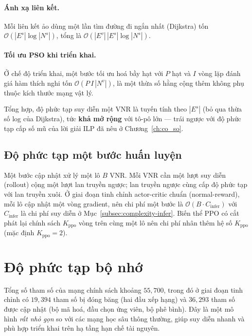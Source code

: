 \documentclass[../DoAn.tex]{subfiles}
\begin{document}
\paragraph{Ánh xạ liên kết.} Mỗi liên kết ảo dùng một lần tìm đường đi ngắn nhất (Dijkstra) tốn $\mathcal{O}(|E^s|\log|N^s|)$, tổng là $\mathcal{O}(|E^v|\,|E^s|\log|N^s|)$.

\paragraph{Tối ưu PSO khi triển khai.} Ở chế độ triển khai, một bước tối ưu hoá bầy hạt với $P$ hạt và $I$ vòng lặp đánh giá hàm thích nghi tốn $\mathcal{O}(P\,I\,|N^v|)$, là một thừa số hằng cộng thêm không phụ thuộc kích thước mạng vật lý.

Tổng hợp, độ phức tạp suy diễn một VNR là tuyến tính theo $|E^s|$ (bỏ qua thừa số log của Dijkstra), tức \textbf{khả mở rộng} với tô-pô lớn — trái ngược với độ phức tạp cấp số mũ của lời giải ILP đã nêu ở Chương~\ref{ch:co_so}.

\subsection{Độ phức tạp một bước huấn luyện}
\label{subsec:complexity-train}

Một bước cập nhật xử lý một lô $B$ VNR. Mỗi VNR cần một lượt suy diễn (rollout) cộng một lượt lan truyền ngược; lan truyền ngược cùng cấp độ phức tạp với lan truyền xuôi. Ở giai đoạn tinh chỉnh actor-critic chuẩn (normal-reward), mỗi lô cập nhật một vòng gradient, nên chi phí một bước là $\mathcal{O}(B \cdot C_{\text{infer}})$ với $C_{\text{infer}}$ là chi phí suy diễn ở Mục~\ref{subsec:complexity-infer}. Biến thể PPO có cắt phát lại chính sách $K_{\text{ppo}}$ vòng trên cùng một lô nên chi phí nhân thêm hệ số $K_{\text{ppo}}$ (mặc định $K_{\text{ppo}}=2$).

\section{Độ phức tạp bộ nhớ}                 %
\label{sec:complexity-mem}

Tổng số tham số của mạng chính sách khoảng $55{,}700$, trong đó ở giai đoạn tinh chỉnh có $19{,}394$ tham số bị đóng băng (hai đầu xếp hạng) và $36{,}293$ tham số được cập nhật (bộ mã hoá, đầu chọn ứng viên, bộ phê bình). Đây là một mô hình \textit{rất nhỏ gọn} so với các mạng học sâu thông thường, giúp suy diễn nhanh và phù hợp triển khai trên hạ tầng hạn chế tài nguyên.
\end{document}

